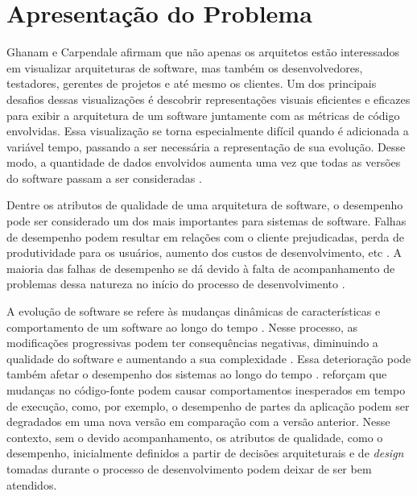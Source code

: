
\section{Apresentação do Problema} \label{sec:apresentacao-do-problema}

Ghanam e Carpendale \cite{Ghanam2008} afirmam que não apenas os arquitetos estão interessados em visualizar arquiteturas de software, mas também os desenvolvedores, testadores, gerentes de projetos e até mesmo os clientes. Um dos principais desafios dessas visualizações é descobrir representações visuais eficientes e eficazes para exibir a arquitetura de um software juntamente com as métricas de código envolvidas. Essa visualização se torna especialmente difícil quando é adicionada a variável tempo, passando a ser necessária a representação de sua evolução. Desse modo, a quantidade de dados envolvidos aumenta uma vez que todas as versões do software passam a ser consideradas \cite{Caserta2011}\cite{Khan2012}.

Dentre os atributos de qualidade de uma arquitetura de software, o desempenho pode ser considerado um dos mais importantes para sistemas de software. Falhas de desempenho podem resultar em relações com o cliente prejudicadas, perda de produtividade para os usuários, aumento dos custos de desenvolvimento, etc \cite{Williams1998}. A maioria das falhas de desempenho se dá devido à falta de acompanhamento de problemas dessa natureza no início do processo de desenvolvimento \cite{Williams1998}.

A evolução de software se refere às mudanças dinâmicas de características e comportamento de um software ao longo do tempo \cite{Pablo2016}. Nesse processo, as modificações progressivas podem ter consequências negativas, diminuindo a qualidade do software e aumentando a sua complexidade \cite{BeladyLaszloA.andLehman1976}\cite{LehmanMeirMandRamilJuanFandWernickPaulDandPerryDewayneEandTurski}. Essa deterioração pode também afetar o desempenho dos sistemas ao longo do tempo \cite{Molyneaux2009}. \citeauthor{SandovalAlcocer2013} reforçam que mudanças no código-fonte podem causar comportamentos inesperados em tempo de execução, como, por exemplo, o desempenho de partes da aplicação podem ser degradados em uma nova versão em comparação com a versão anterior. Nesse contexto, sem o devido acompanhamento, os atributos de qualidade, como o desempenho, inicialmente definidos a partir de decisões arquiteturais e de \textit{design} tomadas durante o processo de desenvolvimento podem deixar de ser bem atendidos.

